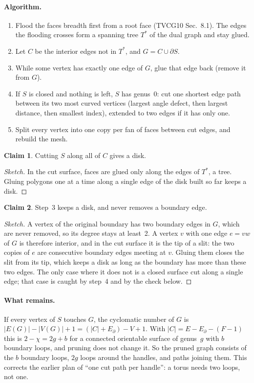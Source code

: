 \documentclass[11pt]{article}
\theoremstyle{definition}
\newtheorem{claim}{Claim}
\begin{document}
\paragraph{Algorithm.}
\begin{enumerate}[nosep]
  \item Flood the faces breadth first from a root face (TVCG10 Sec.~8.1). The
    edges the flooding crosses form a spanning tree $T^*$ of the dual graph and
    stay glued.
  \item Let $C$ be the interior edges not in $T^*$, and $G = C \cup \partial S$.
  \item While some vertex has exactly one edge of $G$, glue that edge back
    (remove it from $G$).
  \item If $S$ is closed and nothing is left, $S$ has genus~0: cut one shortest
    edge path between its two most curved vertices (largest angle defect, then
    largest distance, then smallest index), extended to two edges if it has
    only one.
  \item Split every vertex into one copy per fan of faces between cut edges, and
    rebuild the mesh.
\end{enumerate}

\begin{claim}
Cutting $S$ along all of $C$ gives a disk.
\end{claim}
\begin{proof}[Sketch]
In the cut surface, faces are glued only along the edges of $T^*$, a tree. Gluing
polygons one at a time along a single edge of the disk built so far keeps a
disk.
\end{proof}

\begin{claim}
Step~3 keeps a disk, and never removes a boundary edge.
\end{claim}
\begin{proof}[Sketch]
A vertex of the original boundary has two boundary edges in $G$, which are
never removed, so its degree stays at least~2. A vertex $v$ with one edge
$e = vw$ of $G$ is therefore interior, and in the cut surface it is the tip of
a slit: the two copies of $e$ are consecutive boundary edges meeting at $v$.
Gluing them closes the slit from its tip, which keeps a disk as long as the
boundary has more than these two edges. The only case where it does not is a
closed surface cut along a single edge; that case is caught by step~4 and by
the check below.
\end{proof}

\paragraph{What remains.} If every vertex of $S$ touches $G$, the cyclomatic
number of $G$ is $|E(G)| - |V(G)| + 1 = (|C| + E_\partial) - V + 1$. With
$|C| = E - E_\partial - (F - 1)$ this is $2 - \chi = 2g + b$ for a connected
orientable surface of genus~$g$ with $b$ boundary loops, and pruning does not
change it. So the pruned graph consists of the $b$ boundary loops, $2g$ loops
around the handles, and paths joining them. This corrects the earlier plan of
``one cut path per handle'': a torus needs two loops, not one.
\end{document}
